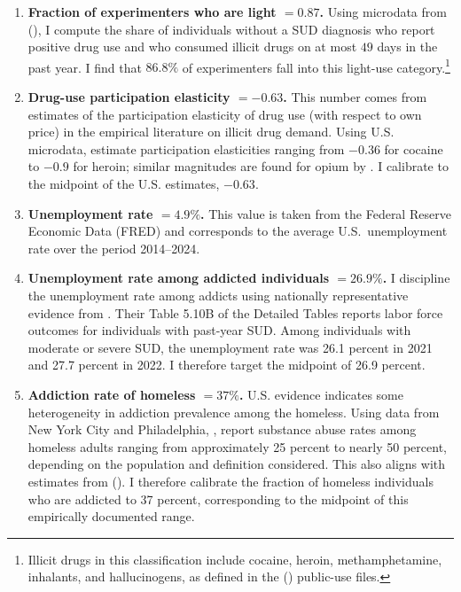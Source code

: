 \documentclass[parskip=full]{article}
\theoremstyle{plain}
\theoremstyle{definition}
\theoremstyle{remark}
\newcommand{\citetshort}[1]{\citetalias{#1} (\citeyear{#1})}
\begin{document}
\begin{enumerate}
\item \textbf{Fraction of experimenters who are light $=0.87$.}
Using microdata from \citetshort{nsduh_2024}, I compute the share of individuals without a SUD diagnosis who report positive drug use and who consumed illicit drugs on at most $49$ days in the past year. I find that $86.8\%$ of experimenters fall into this light-use category.\footnote{Illicit drugs in this classification include cocaine, heroin, methamphetamine, inhalants, and hallucinogens, as defined in the \citetshort{nsduh_2024} public-use files.}

\item \textbf{Drug-use participation elasticity $=-0.63$.} This number comes from estimates of the participation elasticity of drug use (with respect to own price) in the empirical literature on illicit drug demand. Using U.S. microdata, \citet{saffer_chaloupka_1999} estimate participation elasticities ranging from $-0.36$ for cocaine to $-0.9$ 
for heroin; similar magnitudes are found for opium by \citet{vanours1995price}. I calibrate to the midpoint of the U.S. estimates, $-0.63$. 

\item \textbf{Unemployment rate $=4.9\%$.} This value is taken from the Federal Reserve Economic Data (FRED) and corresponds to the average U.S.\ unemployment rate over the period 2014--2024.

\item \textbf{Unemployment rate among addicted individuals $=26.9\%$.} I discipline the unemployment rate among addicts using nationally representative evidence from \citet{nsduh_2022}. Their Table 5.10B of the Detailed Tables reports labor force outcomes for individuals with past-year SUD. Among individuals with moderate or severe SUD, the unemployment rate was 26.1 percent in 2021 and 27.7 percent in 2022. I therefore target the midpoint of 26.9 percent.

\item \textbf{Addiction rate of homeless $=37\%$.} U.S. evidence indicates some heterogeneity in addiction prevalence among the homeless. Using data from New York City and Philadelphia, \citet{kuhn1998}, report substance abuse rates among homeless adults ranging from approximately 25 percent to nearly 50 percent, depending on the population and definition considered. This also aligns with estimates from \citetshort{samhsa_tip55}. I therefore calibrate the fraction of homeless individuals who are addicted to 37 percent, corresponding to the midpoint of this empirically documented range. 


\end{enumerate}
\end{document}
